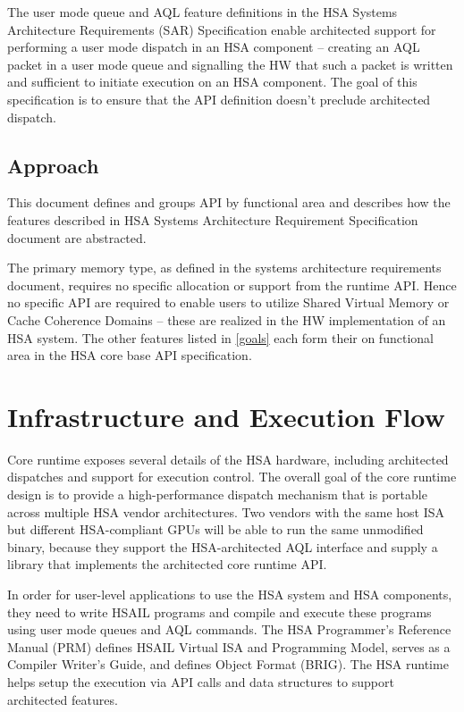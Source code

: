 The user mode queue and AQL feature definitions in the HSA Systems
Architecture Requirements (SAR) Specification enable architected support
for performing a user mode dispatch in an HSA component -- creating
an AQL packet in a user mode queue and signalling the
HW that such a packet is written and sufficient to initiate execution
on an HSA component. The goal of this specification is to ensure
that the API definition doesn't preclude architected dispatch. 

\hypertarget{approach}{}\subsection{Approach}\label{approach}
This document defines and groups API by functional area and
describes how the features described in HSA Systems Architecture
Requirement Specification document are abstracted. 

The primary memory type, as defined in the systems architecture
requirements document, requires no specific allocation or support
from the runtime API. Hence no specific API are required to enable
users to utilize Shared Virtual Memory or Cache Coherence Domains --
these are realized in the HW implementation of an HSA system. The
other features listed in \ref{goals} each form their on functional
area in the HSA core base API specification.

\hypertarget{glue}{}\section{ Infrastructure and Execution
Flow}\label{glue}

Core runtime exposes several details of the HSA hardware,
including architected dispatches and support for execution control.
The overall goal of the core runtime design is to provide a
high-\/performance dispatch mechanism that is portable across
multiple H\-S\-A vendor architectures. Two vendors with the same
host I\-S\-A but different H\-S\-A-\/compliant G\-P\-Us will be able
to run the same unmodified binary, because they support the
H\-S\-A-\/architected A\-Q\-L interface and supply a library
that implements the architected core runtime A\-P\-I. 

In order for user-level applications to use the HSA system and HSA
components, they need to write HSAIL programs and compile and
execute these programs using user mode queues and AQL commands.
The HSA Programmer’s Reference Manual (PRM) defines HSAIL Virtual ISA and Programming Model,
serves as a Compiler Writer’s Guide, and defines Object Format
(BRIG). The HSA runtime helps setup the execution via API calls and
data structures to support architected features.

